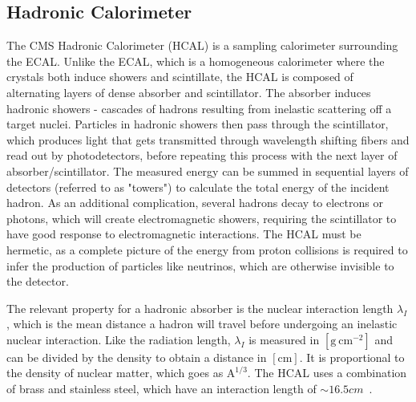 \subsection{Hadronic Calorimeter} \label{sec:CMS_HCAL}
The CMS Hadronic Calorimeter (HCAL) is a sampling calorimeter surrounding the ECAL. Unlike the ECAL, which is a homogeneous calorimeter where the crystals both induce showers and scintillate, the HCAL is composed of alternating layers of dense absorber and scintillator. The absorber induces hadronic showers - cascades of hadrons resulting from inelastic scattering off a target nuclei. Particles in hadronic showers then pass through the scintillator, which produces light that gets transmitted through wavelength shifting fibers and read out by photodetectors, before repeating this process with the next layer of absorber/scintillator. The measured energy can be summed in sequential layers of detectors (referred to as "towers") to calculate the total energy of the incident hadron. As an additional complication, several hadrons decay to electrons or photons, which will create electromagnetic showers, requiring the scintillator to have good response to electromagnetic interactions. The HCAL must be hermetic, as a complete picture of the energy from proton collisions is required to infer the production of particles like neutrinos, which are otherwise invisible to the detector.

The relevant property for a hadronic absorber is the nuclear interaction length $\lambda_I$, which is the mean distance a hadron will travel before undergoing an inelastic nuclear interaction. Like the radiation length, $\lambda_I$ is measured in $\left[\si{\gram\ \centi\metre^{-2}}\right]$ and can be divided by the density to obtain a distance in $\left[\si{\centi\meter}\right]$. It is proportional to the density of nuclear matter, which goes as $\text{A}^{1/3}$. The HCAL uses a combination of brass and stainless steel, which have an interaction length of $\sim16.5\unit{cm}$~\cite{Baiatian:1049915}.


